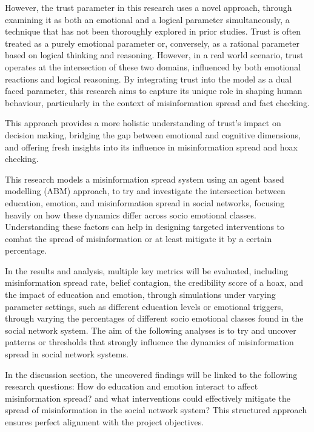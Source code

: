\documentclass[twocolumn, a4paper, 12pt]{article}
\begin{document}
However, the trust parameter in this research uses a novel approach, through examining it as both an emotional and a logical parameter simultaneously, a technique that has not been thoroughly explored in prior studies. Trust is often treated as a purely emotional parameter or, conversely, as a rational parameter based on logical thinking and reasoning. However, in a real world scenario, trust operates at the intersection of these two domains, influenced by both emotional reactions and logical reasoning. By integrating trust into the model as a dual faced parameter, this research aims to capture its unique role in shaping human behaviour, particularly in the context of misinformation spread and fact checking.

This approach provides a more holistic understanding of trust's impact on decision making, bridging the gap between emotional and cognitive dimensions, and offering fresh insights into its influence in misinformation spread and hoax checking.

This research models a misinformation spread system using an agent based modelling (ABM) approach, to try and investigate the intersection between education, emotion, and misinformation spread in social networks, focusing heavily on how these dynamics differ across socio emotional classes. Understanding these factors can help in designing targeted interventions to combat the spread of misinformation or at least mitigate it by a certain percentage.

In the results and analysis, multiple key metrics will be evaluated, including misinformation spread rate, belief contagion, the credibility score of a hoax, and the impact of education and emotion, through simulations under varying parameter settings, such as different education levels or emotional triggers, through varying the percentages of different socio emotional classes found in the social network system. The aim of the following analyses is to try and uncover patterns or thresholds that strongly influence the dynamics of misinformation spread in social network systems.

In the discussion section, the uncovered findings will be linked to the following research questions: How do education and emotion interact to affect misinformation spread? and what interventions could effectively mitigate the spread of misinformation in the social network system? This structured approach ensures perfect alignment with the project objectives.
\end{document}
